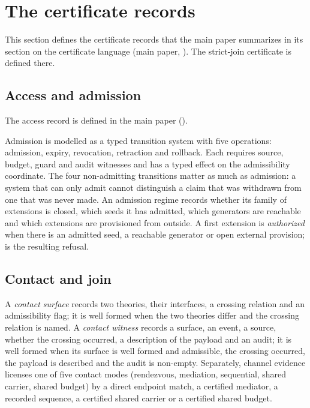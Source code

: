 \section{The certificate records}
\label{supp:certificates}

This section defines the certificate records that the main paper summarizes in its section on
the certificate language (main paper, ). The strict-join certificate is
defined there.

\subsection{Access and admission}

The access record is defined in the main paper ().

Admission is modelled as a typed transition system with five operations: admission,
expiry, revocation, retraction and rollback. Each requires source, budget, guard and audit
witnesses and has a typed effect on the admissibility coordinate. The four non-admitting
transitions matter as much as admission: a system that can only admit cannot distinguish
a claim that was withdrawn from one that was never made. An admission regime records
whether its family of extensions is closed, which seeds it has admitted, which generators
are reachable and which extensions are provisioned from outside. A first extension is
\emph{authorized} when there is an admitted seed, a reachable generator or open external
provision;  is the resulting refusal.

\subsection{Contact and join}

\begin{definition}
\label{def:contact}
A \emph{contact surface} records two theories, their interfaces, a crossing relation and
an admissibility flag; it is well formed when the two theories differ and the crossing
relation is named. A \emph{contact witness} records a surface, an event, a source, whether
the crossing occurred, a description of the payload and an audit; it is well formed when
its surface is well formed and admissible, the crossing occurred, the payload is described
and the audit is non-empty. Separately, channel evidence licenses one of five contact
modes (rendezvous, mediation, sequential, shared carrier, shared budget) by a direct
endpoint match, a certified mediator, a recorded sequence, a certified shared carrier or a
certified shared budget.
\end{definition}

